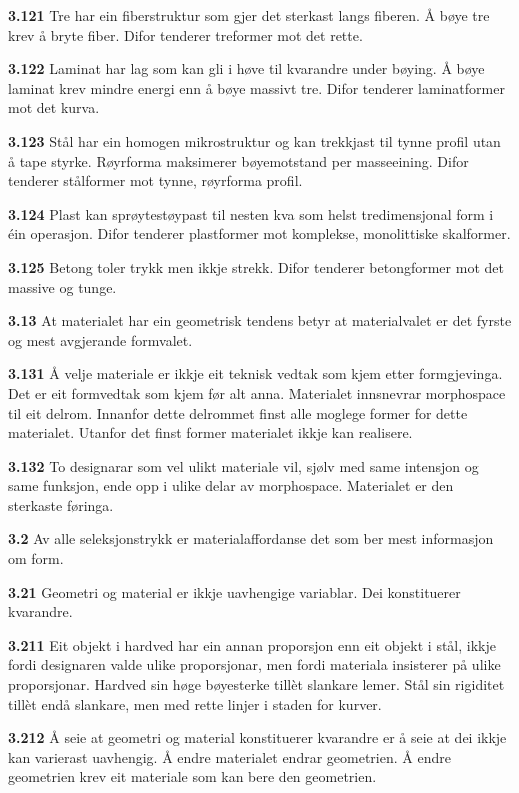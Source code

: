 \documentclass[11pt, a4paper]{article}
\newcommand{\subprop}[1]{\medskip\noindent\textbf{#1}\quad}
\begin{document}
\subprop{3.121} Tre har ein fiberstruktur som gjer det sterkast langs fiberen. \AA{} b\o ye tre krev \aa{} bryte fiber. Difor tenderer treformer mot det rette.

\subprop{3.122} Laminat har lag som kan gli i h\o ve til kvarandre under b\o ying. \AA{} b\o ye laminat krev mindre energi enn \aa{} b\o ye massivt tre. Difor tenderer laminatformer mot det kurva.

\subprop{3.123} St\aa l har ein homogen mikrostruktur og kan trekkjast til tynne profil utan \aa{} tape styrke. R\o yrforma maksimerer b\o yemotstand per masseeining. Difor tenderer st\aa lformer mot tynne, r\o yrforma profil.

\subprop{3.124} Plast kan spr\o ytest\o ypast til nesten kva som helst tredimensjonal form i \'ein operasjon. Difor tenderer plastformer mot komplekse, monolittiske skalformer.

\subprop{3.125} Betong toler trykk men ikkje strekk. Difor tenderer betongformer mot det massive og tunge.

\subprop{3.13} At materialet har ein geometrisk tendens betyr at materialvalet er det fyrste og mest avgjerande formvalet.

\subprop{3.131} \AA{} velje materiale er ikkje eit teknisk vedtak som kjem etter formgjevinga. Det er eit formvedtak som kjem f\o r alt anna. Materialet innsnevrar morphospace til eit delrom. Innanfor dette delrommet finst alle moglege former for dette materialet. Utanfor det finst former materialet ikkje kan realisere.

\subprop{3.132} To designarar som vel ulikt materiale vil, sj\o lv med same intensjon og same funksjon, ende opp i ulike delar av morphospace. Materialet er den sterkaste f\o ringa.

\subprop{3.2} Av alle seleksjonstrykk er materialaffordanse det som ber mest informasjon om form.

\subprop{3.21} Geometri og material er ikkje uavhengige variablar. Dei konstituerer kvarandre.

\subprop{3.211} Eit objekt i hardved har ein annan proporsjon enn eit objekt i st\aa l, ikkje fordi designaren valde ulike proporsjonar, men fordi materiala insisterer p\aa{} ulike proporsjonar. Hardved sin h\o ge b\o yesterke till\`et slankare lemer. St\aa l sin rigiditet till\`et end\aa{} slankare, men med rette linjer i staden for kurver.

\subprop{3.212} \AA{} seie at geometri og material konstituerer kvarandre er \aa{} seie at dei ikkje kan varierast uavhengig. \AA{} endre materialet endrar geometrien. \AA{} endre geometrien krev eit materiale som kan bere den geometrien.
\end{document}
